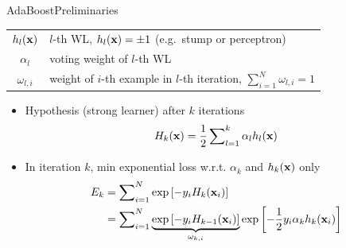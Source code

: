 \documentclass[handout]{beamer}
\begin{document}
\begin{frame}{AdaBoost}{Preliminaries}
\begin{center}
\begin{tabular}{cl}
	$ h_l(\mathrm{\mathbf{x}}) $ & $ l $-th WL, $ h_l(\mathrm{\mathbf{x}}) = \pm 1 $ (e.g.\ stump or perceptron) \\
	$ \alpha_l $ & voting weight of $ l $-th WL \\
	$ \omega_{l, i} $ & weight of $ i $-th example in $ l $-th iteration, $ \sum_{i=1}^N \omega_{l, i} = 1 $
\end{tabular}
\end{center}
\begin{itemize}[<+(1)->]
	
	\item Hypothesis (strong learner) after $ k $ iterations
	\begin{gather*}
		H_k(\mathrm{\mathbf{x}}) = \frac{1}{2} \sum\nolimits_{l=1}^k \alpha_l h_l(\mathrm{\mathbf{x}})
	\end{gather*}
	
	\item In iteration $ k $, min exponential loss \alert{w.r.t. $ \alpha_k $ and $ h_k(\mathrm{\mathbf{x}}) $ only}
	\begin{align*}
		E_k &= \sum\nolimits_{i=1}^N \exp\left[
			-y_i H_k(\mathrm{\mathbf{x}}_i)
		\right]
		\\
		&= \sum\nolimits_{i=1}^N
			\underbrace{\exp\left[-y_i H_{k-1}(\mathrm{\mathbf{x}}_i)\right]}_{\omega_{k, i}}
			\exp\left[-\frac{1}{2}y_i\alpha_k h_k(\mathrm{\mathbf{x}}_i)\right]
	\end{align*}
\end{itemize}
\end{frame}
\end{document}
